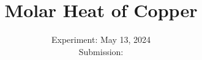 

\subject{\texorpdfstring{\vspace{2ex}}{}V47\texorpdfstring{\vspace{-2ex}}{}} %
\title{Molar Heat of Copper} %
\date{
	Experiment: May 13, 2024 %
	\\ Submission: %
}




\maketitle
\thispagestyle{empty}


\tableofcontents
\newpage








\printbibliography{}

\newpage



